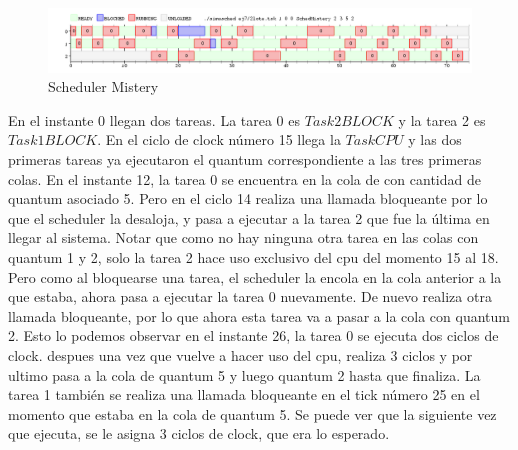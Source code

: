 \begin{itemize}
\begin{itemize}
\end{itemize}

\begin{figure}[H]
  \centering
    \includegraphics[width=1\textwidth]{../ej7/todojuntomistery.png}
    \caption{Scheduler Mistery}
\end{figure}


En el instante 0 llegan dos tareas. La tarea 0 es $Task2BLOCK$ y la tarea 2 es $Task1BLOCK$. En el ciclo de clock número 15 llega la $TaskCPU$ y
las dos primeras tareas ya ejecutaron el quantum correspondiente a las tres primeras colas. En el instante 12, la tarea 0 se encuentra en la cola de con 
cantidad de quantum asociado 5. Pero en el ciclo 14 realiza una llamada bloqueante por lo que el scheduler la desaloja, y pasa a ejecutar a la tarea 2 que fue la 
última en llegar al sistema. Notar que como no hay ninguna otra tarea en las colas con quantum 1 y 2, solo la tarea 2 hace uso exclusivo del cpu 
del momento 15 al 18. Pero como al bloquearse una tarea, el scheduler la encola en la cola anterior a la que estaba, ahora pasa a ejecutar la tarea 0 nuevamente.
De nuevo realiza otra llamada bloqueante, por lo que ahora esta tarea va a pasar a la cola con quantum 2. Esto lo podemos observar en el instante 26, la tarea 0 
se ejecuta dos ciclos de clock. despues una vez que vuelve a hacer uso del cpu, realiza 3 ciclos y por ultimo pasa a la cola de quantum 5 y luego quantum 2 hasta que finaliza.
La tarea 1 también se realiza una llamada bloqueante en el tick número 25 en el momento que estaba en la cola de quantum 5. Se puede ver que la siguiente vez que 
ejecuta, se le asigna 3 ciclos de clock, que era lo esperado. 





